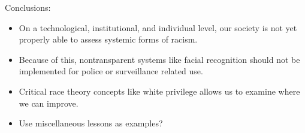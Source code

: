 \documentclass[12pt, letterpaper]{article}
\begin{document}
\begin{mla}
\vspace{\baselineskip}
\noindent
Conclusions:
\begin{itemize}
	\item On a technological, institutional, and individual level, our society
	is not yet properly able to assess systemic forms of racism.
	\item Because of this, nontransparent systems like facial recognition
	should not be implemented for police or surveillance related use.
	\item Critical race theory concepts like white privilege allows us to
	examine where we can improve.
	\item Use miscellaneous lessons as examples?
\end{itemize}





\end{mla}
\end{document}
